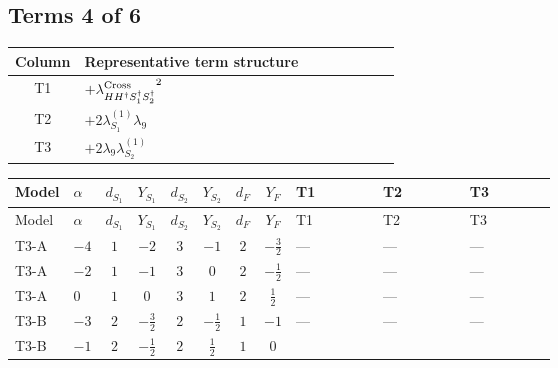 \documentclass[8pt]{article}
\begin{document}
\begin{landscape}
\subsection*{Terms 4 of 6}
\begin{center}
\begin{tabular}{@{}c >{\raggedright\arraybackslash}p{0.82\linewidth}@{}}
\toprule
Column & Representative term structure \\
\midrule
T1 & \(\displaystyle +{\lambda_{H H^\dagger S_1^\dagger S_2^\dagger}^{\rm Cross}}^2\) \\
\midrule
T2 & \(\displaystyle +2 {\lambda_{S_1}^{(1)}} {\lambda_{9}}\) \\
\midrule
T3 & \(\displaystyle +2 {\lambda_{9}} {\lambda_{S_2}^{(1)}}\) \\
\midrule
\bottomrule
\end{tabular}
\end{center}
\smallskip
\tiny
\begin{longtable}{@{}llcccccc >{\raggedright\arraybackslash}p{0.21\linewidth} >{\raggedright\arraybackslash}p{0.21\linewidth} >{\raggedright\arraybackslash}p{0.21\linewidth}@{}}
\toprule
Model & $\alpha$ & $d_{S_1}$ & $Y_{S_1}$ & $d_{S_2}$ & $Y_{S_2}$ & $d_F$ & $Y_F$ & T1 & T2 & T3 \\
\midrule
\endfirsthead
\toprule
Model & $\alpha$ & $d_{S_1}$ & $Y_{S_1}$ & $d_{S_2}$ & $Y_{S_2}$ & $d_F$ & $Y_F$ & T1 & T2 & T3 \\
\midrule
\endhead
T3-A & $-4$ & $1$ & $-2$ & $3$ & $-1$ & $2$ & $-\frac{3}{2}$ & --- & --- & --- \\
\midrule
T3-A & $-2$ & $1$ & $-1$ & $3$ & $0$ & $2$ & $-\frac{1}{2}$ & --- & --- & --- \\
\midrule
T3-A & $0$ & $1$ & $0$ & $3$ & $1$ & $2$ & $\frac{1}{2}$ & --- & --- & --- \\
\midrule
T3-B & $-3$ & $2$ & $-\frac{3}{2}$ & $2$ & $-\frac{1}{2}$ & $1$ & $-1$ & --- & --- & --- \\
\midrule
T3-B & $-1$ & $2$ & $-\frac{1}{2}$ & $2$ & $\frac{1}{2}$ & $1$ & $0$ & \scriptsize\adjustbox{max width=\linewidth}{$\begin{gathered} +{\lambda_{H H^\dagger S_1^\dagger S_2^\dagger}^{\rm Cross}}^2\end{gathered}$} & \scriptsize\adjustbox{max width=\linewidth}{$\begin{gathered} +2 {\lambda_{S_1}^{(1)}} {\lambda_{9}}\end{gathered}$} & \scriptsize\adjustbox{max width=\linewidth}{$\begin{gathered} +2 {\lambda_{9}} {\lambda_{S_2}^{(1)}}\end{gathered}$} \\

\end{longtable}
\end{landscape}
\end{document}
